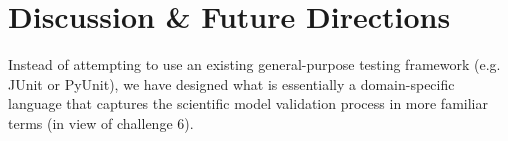 \documentclass[9pt]{sig-alternate}
\newcommand{\verbx}[1]{\lstinline{#1}}
\begin{document}
%

\vspace{5px}
\section{Discussion \& Future Directions}\label{discussion}
Instead of attempting to use an existing general-purpose testing framework (e.g. JUnit or PyUnit), we have designed what is essentially a domain-specific language that captures the scientific model validation process in more familiar terms (in view of challenge 6).%

\end{document}
